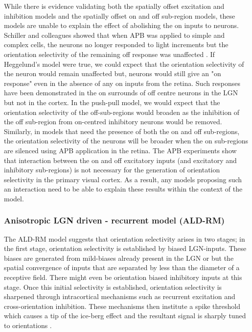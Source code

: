 While there is evidence validating both the spatially offset excitation and inhibition models and the spatially offset on and off sub-region models, these models are unable to explain the effect of abolishing the on inputs to neurons. Schiller and colleagues showed that when APB was applied to simple and complex cells, the neurons no longer responded to light increments but the orientation selectivity of the remaining off response was unaffected \cite{Schiller1992}. If Heggelund's model were true, we could expect that the orientation selectivity of the neuron would remain unaffected but, neurons would still give an "on response" even in the absence of any on inputs from the retina. Such responses have been demonstrated in the on surrounds of off centre neurons in the LGN but not in the cortex. In the push-pull model, we would expect that the orientation selectivity of the off-sub-regions would broaden as the inhibition of the off sub-region from on-centred inhibitory neurons would be removed. Similarly, in models that need the presence of both the on and off sub-regions, the orientation selectivity of the neurons will be broader when the on sub-regions are silenced using APB application in the retina. The APB experiments show that interaction between the on and off excitatory inputs (and excitatory and inhibitory sub-regions) is not necessary for the generation of orientation selectivity in the primary visual cortex. As a result, any models proposing such an interaction need to be able to explain these results within the context of the model.


\subsubsection{Anisotropic LGN driven - recurrent model (ALD-RM)}

The ALD-RM model suggests that orientation selectivity arises in two stages; in the first stage, orientation selectivity is established by biased LGN-inputs. These biases are generated from mild-biases already present in the LGN or but the spatial convergence of inputs that are separated by less than the diameter of a receptive field. There might even be orientation biased inhibitory inputs at this stage. Once this initial selectivity is established, orientation selectivity is sharpened through intracortical mechanisms such as recurrent excitation and cross-orientation inhibition. These mechanisms then institute a spike threshold which causes a tip of the ice-berg effect and the resultant signal is sharply tuned to orientations \cite{Vidyasagar1987, Vidyasagar1996b}.

